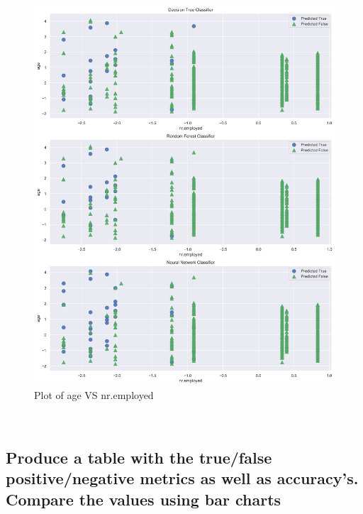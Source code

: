 \clearpage{}
\begin{figure}[!ht]
 \centering
\includegraphics[width=\textwidth,height=\textheight,keepaspectratio]{assignment2/1-4-age and nremployed features.png}
\caption{\label{fig:2dplot1}Plot of age VS nr.employed }
\end{figure}
\\


\newpage
\subsection{Produce a table with the true/false positive/negative metrics as well as accuracy's. Compare the values using bar charts}


